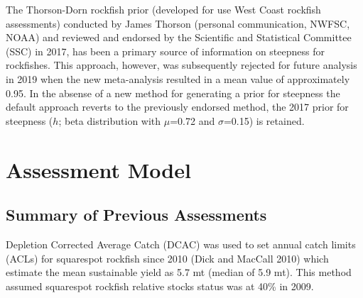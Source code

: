 \documentclass[11pt,
  english,
  a4paper,
]{article}
\begin{document}
\leavevmode\tagmcend\tagstructend


The Thorson-Dorn rockfish prior (developed for use West Coast rockfish assessments) conducted by James Thorson (personal communication, NWFSC, NOAA) and reviewed and endorsed by the Scientific and Statistical Committee (SSC) in 2017, has been a primary source of information on steepness for rockfishes. This approach, however, was subsequently rejected for future analysis in 2019 when the new meta-analysis resulted in a mean value of approximately 0.95. In the absense of a new method for generating a prior for steepness the default approach reverts to the previously endorsed method, the 2017 prior for steepness ({\(h\)\leavevmode\tagmcend\tagstructend}; beta distribution with {\(\mu\)\leavevmode\tagmcend\tagstructend}=0.72 and {\(\sigma\)\leavevmode\tagmcend\tagstructend}=0.15) is retained.

\leavevmode\tagmcend\tagstructend\par


\hypertarget{assessment-model}{%
\section{Assessment Model}\label{assessment-model}}

\leavevmode\tagmcend\tagstructend


\hypertarget{summary-of-previous-assessments}{%
\subsection{Summary of Previous Assessments}\label{summary-of-previous-assessments}}

\leavevmode\tagmcend\tagstructend


Depletion Corrected Average Catch (DCAC) was used to set annual catch limits (ACLs) for squarespot rockfish since 2010 {(Dick and MacCall 2010)\leavevmode\tagmcend\tagstructend} which estimate the mean sustainable yield as 5.7 mt (median of 5.9 mt). This method assumed squarespot rockfish relative stocks status was at 40\% in 2009.
\end{document}
